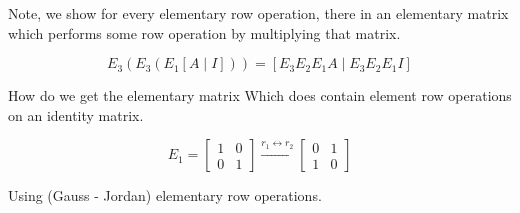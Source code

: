 \documentclass[main.tex]{subfiles}
\begin{document}
    Note, we show for every elementary row operation, there in an elementary matrix which performs some row operation by multiplying that matrix.

    $$
    E_{3}\left(E_{3}\left(E_{1}[A \mid I]\right)\right) = {\left[E_{3} E_{2} E_{1} A \mid E_{3} E_{2} E_{1} I\right]}
    $$

    How do we get the elementary matrix Which does contain element row operations on an identity matrix.

    $$
    E_{1}=\left[\begin{array}{ll}
    1 & 0 \\
    0 & 1
    \end{array}\right] \stackrel{r_{1} \longleftrightarrow r_{2}}{\longrightarrow}\left[\begin{array}{ll}
    0 & 1 \\
    1 & 0
    \end{array}\right]
    $$

    Using (Gauss - Jordan) elementary row operations.
\end{document}
